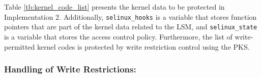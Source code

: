 Table \ref{tb:kernel_code_list} presents the kernel data to be protected in
Implementation 2. Additionally, \verb|selinux_hooks| is a variable that stores function
pointers that are part of the kernel data related to the LSM, and
\verb|selinux_state| is a variable that stores the access control policy. Furthermore,
the list of write-permitted kernel codes is protected by write restriction
control using the PKS.


\begin{table}[t]
  \centering
    \caption{
      Protected kernel data and write-permitted kernel code of Implementation 2
    }
\label{tb:kernel_code_list}
\end{table}

\subsubsection{Handling of Write Restrictions:} 

